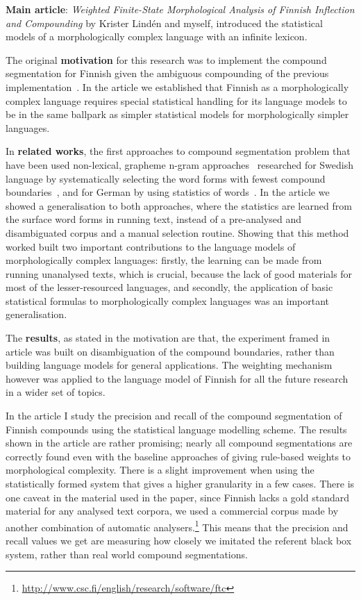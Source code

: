 \documentclass[officiallayout]{unihelcompling}
\begin{document}
\textbf{Main article}: \emph{Weighted Finite-State Morphological Analysis of
Finnish Inflection and Compounding}  by Krister
Lindén and myself, introduced the statistical models of a morphologically
complex language with an infinite lexicon.

The original \textbf{motivation} for this research was to implement the
compound segmentation for Finnish given the ambiguous compounding of the
previous implementation~\citep{pirinen2008suomen}. In the article we
established that Finnish as a morphologically complex language requires special
statistical handling for its language models to be in the same ballpark as
simpler statistical models for morphologically simpler languages.

In \textbf{related works}, the first approaches to compound segmentation
problem that have been used non-lexical, grapheme n-gram
approaches~\cite{kokkinakis2008semantically} researched for Swedish language by
systematically selecting the word forms with fewest compound
boundaries~\citep{karlsson1992swetwol}, and for German by using statistics of
words~\citep{schiller2006german}. In the article we showed a generalisation to
both approaches, where the statistics are learned from the surface word forms
in running text, instead of a pre-analysed and disambiguated corpus and a
manual selection routine.  Showing that this method worked built two important
contributions to the language models of morphologically complex languages:
firstly, the learning can be made from running unanalysed texts, which is
crucial, because the lack of good materials for most of the lesser-resourced
languages, and secondly, the application of basic statistical formulas to
morphologically complex languages was an important generalisation.

The \textbf{results}, as stated in the motivation are that, the experiment
framed in article was built on disambiguation of the compound boundaries,
rather than building language models for general applications. The weighting
mechanism however was applied to the language model of Finnish for all the
future research in a wider set of topics.

In the article I study the precision and recall of the compound segmentation of
Finnish compounds using the statistical language modelling scheme. The results
shown in the article are rather promising; nearly all compound segmentations
are correctly found even with the baseline approaches of giving rule-based
weights to morphological complexity. There is a slight improvement when using
the statistically formed system that gives a higher granularity in a few cases.
There is one caveat in the material used in the paper, since Finnish lacks a
gold standard material for any analysed text corpora, we used a commercial
corpus made by another combination of automatic
analysers.\footnote{\url{http://www.csc.fi/english/research/software/ftc}} This
means that the precision and recall values we get are measuring how closely we
imitated the referent black box system, rather than real world compound
segmentations.
\end{document}
